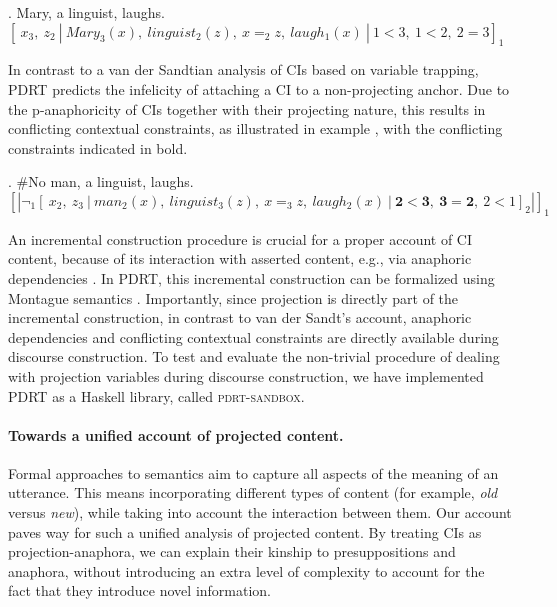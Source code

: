 \documentclass[letterpaper,11pt]{article}
\begin{document}
\vspace{-0.10cm}
\ex.  Mary, a linguist, laughs.\\
{\small 
  $[~x_3,~z_2~
   |~Mary_3(x),~linguist_2(z),~x=_2z,~laugh_1(x)~
 |~1 < 3,~1 < 2,~2=3]_1$
}

\vspace{-0.10cm}
\noindent In contrast to a van der Sandtian analysis of CIs
based on variable trapping, PDRT predicts the infelicity of attaching a CI
to a non-projecting anchor. Due to the p-anaphoricity of CIs together with
their projecting nature, this results in conflicting contextual constraints,
as illustrated in example \Next, with the conflicting constraints
indicated in bold.

\vspace{-0.10cm}
\ex. \#No man, a linguist, laughs.\\
{\small 
  $[|\neg_1[~x_2,~z_3~
   |~man_2(x),~linguist_3(z),~x=_3z,~laugh_2(x)~
   |{\mathbf{~2 < 3,~3 = 2}},~2 < 1]_2|]_1$
}

\vspace{-0.10cm} 
\noindent An incremental construction procedure is crucial
for a proper account of CI content, because of its interaction with asserted
content, e.g., via anaphoric dependencies \citep{anderbois2010crossing}.  In
PDRT, this incremental construction can be formalized using Montague
semantics \citep[cf.][]{muskens1996combining}.  Importantly, since
projection is directly part of the incremental construction, in contrast to
van der Sandt's account, anaphoric dependencies and conflicting contextual
constraints are directly available during discourse construction. To test
and evaluate the non-trivial procedure of dealing with projection variables
during discourse construction, we have implemented PDRT as a Haskell
library, called \textsc{pdrt-sandbox}.


\paragraph{Towards a unified account of projected content.} Formal
approaches to semantics aim to capture all aspects of the meaning of an
utterance. This means incorporating different types of content (for example,
\emph{old} versus \emph{new}), while taking into account the interaction
between them.  Our account paves way for such a unified analysis of
projected content.  By treating CIs as projection-anaphora, we can explain
their kinship to presuppositions and anaphora, without introducing an extra
level of complexity to account for the fact that they introduce novel
information.

\small
\vspace{0.4cm}
 
 
\end{document}
